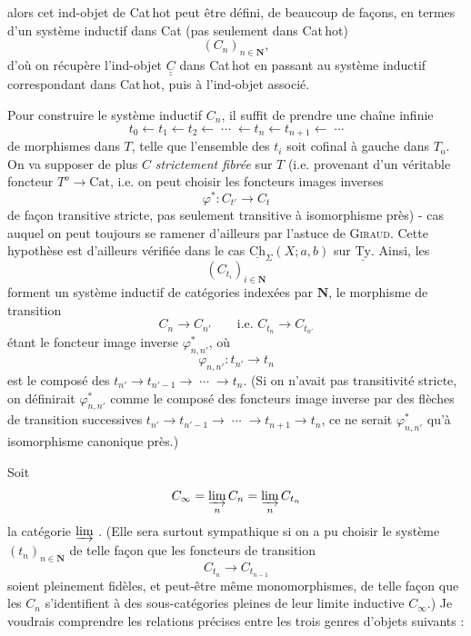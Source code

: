 \documentclass[11pt]{article}
\newcommand{\printedpage}[1]{\marginpar{\footnotesize p.~#1}}
\newcommand{\msp}[1]{\marginpar{\footnotesize [#1]}}
\newcommand{\uTy}{\underline{\mathrm{Ty}}}
\newcommand{\uCh}{\underline{\mathrm{Ch}}}
\newcommand{\Cat}{\mathrm{Cat}}
\newcommand{\To}{T_{\mathrm{o}}}
\begin{document}
alors cet ind-objet de Cat\,hot peut être défini, de beaucoup de façons, en termes
\msp{page 101}
d'un système inductif dans Cat (pas seulement dans Cat\,hot)
\[
(C_{n})_{n\in\mathbf{N}},
\]
d'où on récupère l'ind-objet $\underline{\underline{C}}$ dans Cat\,hot en passant au système inductif correspondant dans Cat\,hot, puis à l'ind-objet associé.

Pour construire le système inductif $C_{n}$, il suffit de prendre une chaîne infinie
\[
t_{0} \longleftarrow t_{1} \longleftarrow t_{2} \longleftarrow \;\cdots\; \longleftarrow t_{n} \longleftarrow t_{n+1} \longleftarrow \;\cdots
\]
de morphismes dans $T$, telle que l'ensemble des $t_{i}$ soit cofinal à gauche dans $\To$. On va supposer de plus $C$ \textit{strictement fibrée} sur $T$ (i.e. provenant d'un véritable foncteur $T^{o} \longrightarrow \Cat$, i.e. on peut choisir les foncteurs images inverses
\[
\varphi^{*} : C_{t'} \longrightarrow C_{t}
\]
de façon transitive stricte, pas seulement transitive à isomorphisme près) - cas auquel on peut toujours se ramener d'ailleurs par l'astuce de \textsc{Giraud}. Cette hypothèse est d'ailleurs vérifiée dans le cas $\uCh_{\Sigma}(X;a,b)$ sur $\uTy$. Ainsi, les
\[
(C_{t_{i}})_{i\in\mathbf{N}}
\]
forment un système inductif de catégories indexées par $\mathbf{N}$, le morphisme de transition
\[
C_{n} \longrightarrow C_{n'} \qquad \text{i.e. } C_{t_{n}} \longrightarrow C_{t_{n'}}
\]
\printedpage{66}
\msp{page 102}
étant le foncteur image inverse $\varphi^{*}_{n,n'}$, où
\[
\varphi_{n,n'} : t_{n'} \longrightarrow t_{n}
\]
est le composé des $t_{n'} \longrightarrow t_{n'-1} \longrightarrow \;\cdots\; \longrightarrow t_{n}$. (Si on n'avait pas transitivité stricte, on définirait $\varphi^{*}_{n,n'}$ comme le composé des foncteurs image inverse par des flèches de transition successives $t_{n'} \longrightarrow t_{n'-1} \longrightarrow \;\cdots\; \longrightarrow t_{n+1} \longrightarrow t_{n}$, ce ne serait $\varphi^{*}_{n,n'}$ qu'à isomorphisme canonique près.)

Soit
\[
C_{\infty} = \varinjlim_{n} C_{n} = \varinjlim_{n} C_{t_{n}}
\]
la catégorie $\varinjlim$ . (Elle sera surtout sympathique si on a pu choisir le système $(t_{n})_{n\in\mathbf{N}}$ de telle façon que les foncteurs de transition
\[
C_{t_{n}} \longrightarrow C_{t_{n-1}}
\]
soient pleinement fidèles, et peut-être même monomorphismes, de telle façon que les $C_{n}$ s'identifient à des sous-catégories pleines de leur limite inductive $C_{\infty}$.) Je voudrais comprendre les relations précises entre les trois genres d'objets suivants :
\end{document}
